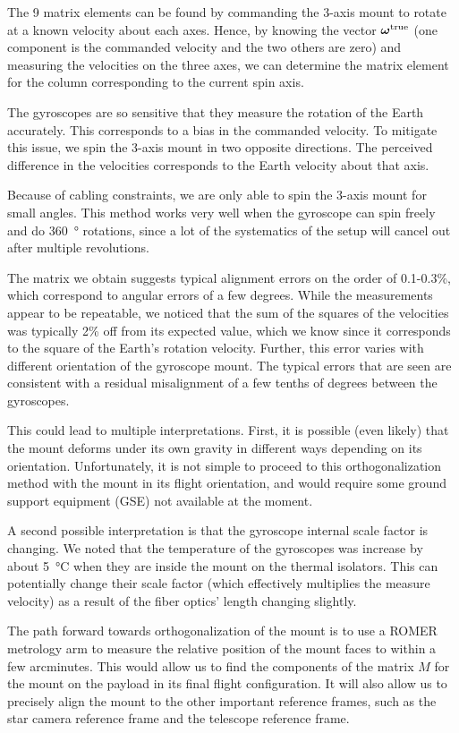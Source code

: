 The 9 matrix elements can be found by commanding the 3-axis mount to rotate at a known velocity about each axes. Hence, by knowing the vector $\boldsymbol\omega^\textrm{true}$ (one component is the commanded velocity and the two others are zero) and measuring the velocities on the three axes, we can determine the matrix element for the column corresponding to the current spin axis. 

The gyroscopes are so sensitive that they measure the rotation of the Earth accurately. This corresponds to a bias in the commanded velocity. To mitigate this issue, we spin the 3-axis mount in two opposite directions. The perceived difference in the velocities corresponds to the Earth velocity about that axis. 

Because of cabling constraints, we are only able to spin the 3-axis mount for small angles. This method works very well when the gyroscope can spin freely and do \SI{360}{\degree} rotations, since a lot of the systematics of the setup will cancel out after multiple revolutions. 

The matrix we obtain suggests typical alignment errors on the order of 0.1-0.3\%, which correspond to angular errors of a few degrees. While the measurements appear to be repeatable, we noticed that the sum of the squares of the velocities was typically 2\% off from its expected value, which we know since it corresponds to the square of the Earth's rotation velocity. Further, this error varies with different orientation of the gyroscope mount. The typical errors that are seen are consistent with a residual misalignment of a few tenths of degrees between the gyroscopes.

This could lead to multiple interpretations. First, it is possible (even likely) that the mount deforms under its own gravity in different ways depending on its orientation. Unfortunately, it is not simple to proceed to this orthogonalization method with the mount in its flight orientation, and would require some ground support equipment (GSE) not available at the moment. 

A second possible interpretation is that the gyroscope internal scale factor is changing. We noted that the temperature of the gyroscopes was increase by about \SI{5}{\degreeCelsius} when they are inside the mount on the thermal isolators. This can potentially change their scale factor (which effectively multiplies the measure velocity) as a result of the fiber optics' length changing slightly. 

The path forward towards orthogonalization of the mount is to use a ROMER metrology arm to measure the relative position of the mount faces to within a few arcminutes. This would allow us to find the components of the matrix $M$ for the mount on the payload in its final flight configuration. It will also allow us to precisely align the mount to the other important reference frames, such as the star camera reference frame and the telescope reference frame.

